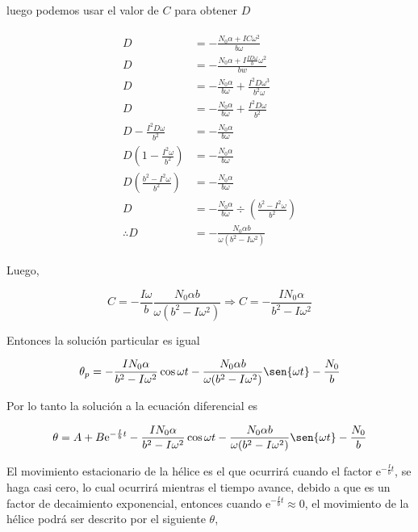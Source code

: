 \documentclass[a4paper,10pt]{article}
\numberwithin{equation}{section}
\newcommand{\euler}{\mathrm{e}}
\begin{document}
luego podemos usar el valor de $C$ para obtener $D$

\begin{align*}
 \begin{split}
  D &= - \frac{N_0 \alpha + IC\omega^2}{b\omega} \\
  D &= - \frac{N_0 \alpha + I \frac{ID\omega}{b} \omega^2}{bw} \\
  D &= - \frac{N_0 \alpha}{b\omega} + \frac{I^2 D \omega^3}{b^2\omega} \\
  D &= - \frac{N_0 \alpha}{b\omega} + \frac{I^2D\omega}{b^2} \\
  D - \frac{I^2D\omega}{b^2} &= - \frac{N_0 \alpha}{b\omega} \\
  D  \left(1 - \frac{I^2\omega}{b^2} \right) &= - \frac{N_0 \alpha}{b\omega} \\
  D \left(\frac{b^2-I^2\omega}{b^2} \right) &= - \frac{N_0 \alpha}{b\omega} \\
  D &= - \frac{N_0\alpha}{b\omega} \div \left(\frac{b^2-I^2\omega}{b^2} \right) \\
  \therefore D &= - \frac{N_0 \alpha b}{\omega(b^2-I\omega^2)}
 \end{split}
\end{align*}

Luego,

$$
C = - \frac{I\omega}{b}  \frac{N_0 \alpha b}{\omega(b^2-I\omega^2)} 
\Rightarrow C = - \frac{IN_0 \alpha}{b^2-I\omega^2}
$$

Entonces la solución particular es igual 

\begin{equation}
 \theta_p = - \frac{IN_0 \alpha}{b^2-I\omega^2} \cos{\omega t} 
 - \frac{N_0 \alpha b}{\omega(b^2-I\omega^2)} \sen{\omega t} - \frac{N_0}{b}
\end{equation}


Por lo tanto la solución a la ecuación diferencial es

\begin{equation}
 \theta = A + B \euler^{-\frac{I}{b}t} - \frac{IN_0 \alpha}{b^2-I\omega^2} \cos{\omega t} 
 - \frac{N_0 \alpha b}{\omega(b^2-I\omega^2)} \sen{\omega t} - \frac{N_0}{b}
\end{equation}

El movimiento estacionario de la hélice es el que ocurrirá cuando el factor $\euler^{-\frac{I}{b}t}$, 
se haga casi cero, lo cual ocurrirá mientras el tiempo avance, debido a que es un factor de 
decaimiento exponencial, entonces cuando $\euler^{-\frac{I}{b}t} \approx 0$, el movimiento
de la hélice podrá ser descrito por el siguiente $\theta$, 
\end{document}
